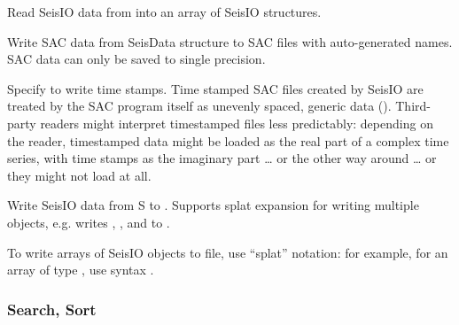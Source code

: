 \documentclass[letterpaper,11pt,english]{sphinxmanual}
\begin{document}
\begin{fulllineitems}
\end{fulllineitems}


Read SeisIO data from  into an array of SeisIO structures.


\begin{fulllineitems}
\end{fulllineitems}


Write SAC data from SeisData structure  to SAC files with auto-generated names. SAC data can only be saved to single precision.

Specify  to write time stamps. Time stamped SAC files created by SeisIO are treated by the SAC program itself as unevenly spaced, generic  data (). Third-party readers might interpret timestamped files less predictably: depending on the reader, timestamped data might be loaded as the real part of a complex time series, with time stamps as the imaginary part … or the other way around … or they might not load at all.


\begin{fulllineitems}
\end{fulllineitems}


Write SeisIO data from S to . Supports splat expansion for writing multiple objects, e.g.  writes , , and  to .

To write arrays of SeisIO objects to file, use “splat” notation: for example, for an array  of type , use syntax .


\subsubsection{Search, Sort}
\label{\detokenize{src/seisdata:search-sort}}

\begin{fulllineitems}
\end{fulllineitems}
\end{document}
